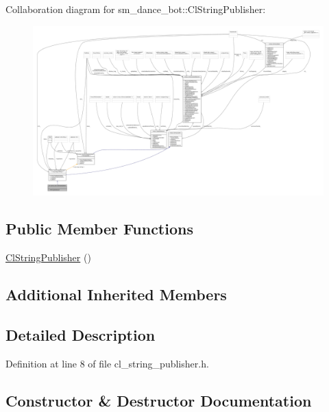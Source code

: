 Collaboration diagram for sm\+\_\+dance\+\_\+bot\+:\+:Cl\+String\+Publisher\+:
\nopagebreak
\begin{figure}[H]
\begin{center}
\leavevmode
\includegraphics[width=350pt]{classsm__dance__bot_1_1ClStringPublisher__coll__graph}
\end{center}
\end{figure}
\subsection*{Public Member Functions}
\begin{DoxyCompactItemize}
\item 
\hyperlink{classsm__dance__bot_1_1ClStringPublisher_aeaf81c3d8670b1a9b9371d505117732c}{Cl\+String\+Publisher} ()
\end{DoxyCompactItemize}
\subsection*{Additional Inherited Members}


\subsection{Detailed Description}


Definition at line 8 of file cl\+\_\+string\+\_\+publisher.\+h.



\subsection{Constructor \& Destructor Documentation}
